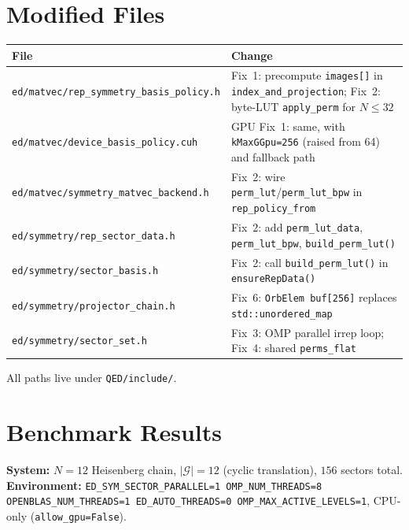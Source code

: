 \documentclass[11pt,a4paper]{article}
\begin{document}
\section{Modified Files}
\label{sec:files}

\begin{center}
\begin{tabular}{@{}lp{9cm}@{}}
\toprule
File & Change \\
\midrule
\texttt{ed/matvec/rep\_symmetry\_basis\_policy.h}
  & Fix~1: precompute \texttt{images[]} in \texttt{index\_and\_projection};
    Fix~2: byte-LUT \texttt{apply\_perm} for $N\le 32$ \\
\texttt{ed/matvec/device\_basis\_policy.cuh}
  & GPU Fix~1: same, with \texttt{kMaxGGpu=256} (raised from 64) and fallback path \\
\texttt{ed/matvec/symmetry\_matvec\_backend.h}
  & Fix~2: wire \texttt{perm\_lut}/\texttt{perm\_lut\_bpw} in \texttt{rep\_policy\_from} \\
\texttt{ed/symmetry/rep\_sector\_data.h}
  & Fix~2: add \texttt{perm\_lut\_data}, \texttt{perm\_lut\_bpw}, \texttt{build\_perm\_lut()} \\
\texttt{ed/symmetry/sector\_basis.h}
  & Fix~2: call \texttt{build\_perm\_lut()} in \texttt{ensureRepData()} \\
\texttt{ed/symmetry/projector\_chain.h}
  & Fix~6: \texttt{OrbElem buf[256]} replaces \texttt{std::unordered\_map} \\
\texttt{ed/symmetry/sector\_set.h}
  & Fix~3: OMP parallel irrep loop; Fix~4: shared \texttt{perms\_flat} \\
\bottomrule
\end{tabular}
\end{center}

All paths live under \texttt{QED/include/}.

\section{Benchmark Results}
\label{sec:bench}

\textbf{System:} $N=12$ Heisenberg chain, $|\mathcal{G}|=12$ (cyclic
translation), $156$ sectors total.\\
\textbf{Environment:}
\texttt{ED\_SYM\_SECTOR\_PARALLEL=1 OMP\_NUM\_THREADS=8
OPENBLAS\_NUM\_THREADS=1 ED\_AUTO\_THREADS=0 OMP\_MAX\_ACTIVE\_LEVELS=1},
CPU-only (\texttt{allow\_gpu=False}).
\end{document}
